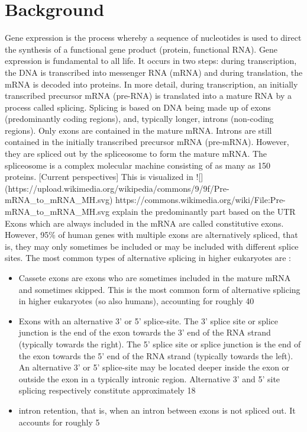 \chapter{\label{ch:2-litreview}Background}

\minitoc

Gene expression is the process whereby a sequence of nucleotides is used to direct the synthesis of a functional gene product (protein, functional RNA). Gene expression is fundamental to all life. It occurs in two steps: during transcription, the DNA is transcribed into messenger RNA (mRNA) and during translation, the mRNA is decoded into proteins.
In more detail, during transcription, an initially transcribed precursor mRNA (pre-RNA) is translated into a mature RNA by a process called splicing. Splicing is based on DNA being made up of exons (predominantly coding regions), and, typically longer, introns (non-coding regions).
Only exons are contained in the mature mRNA. Introns are still contained in the initially transcribed precursor mRNA (pre-mRNA). However, they are spliced out by the spliceosome to form the mature mRNA. The spliceosome is a complex molecular machine consisting of as many as 150 proteins. [Current perspectives] This is visualized in ![](https://upload.wikimedia.org/wikipedia/commons/9/9f/Pre-mRNA_to_mRNA_MH.svg)
https://commons.wikimedia.org/wiki/File:Pre-mRNA_to_mRNA_MH.svg
explain the predominantly part based on the UTR
Exons which are always included in the mRNA are called constitutive exons. However, 95\% of human genes with multiple exons are alternatively spliced, that is, they may only sometimes be included or may be included with different splice sites. The most common types of alternative splicing in higher eukaryotes are \cite{commonsplicing1}\cite{commonsplicing2}:

\begin{itemize}
\item Cassete exons are exons who are sometimes included in the mature mRNA and sometimes skipped. This is the most common form of alternative splicing in higher eukaryotes (so also humans), accounting for roughly 40%
\item Exons with an alternative 3' or 5' splice-site. The 3' splice site or splice junction is the end of the exon towards the 3' end of the RNA strand (typically towards the right). The 5' splice site or splice junction is the end of the exon towards the 5' end of the RNA strand (typically towards the left). An alternative 3' or 5' splice-site may be located deeper inside the exon or outside the exon in a typically intronic region. Alternative 3' and 5' site splicing respectively constitute approximately 18%
\item intron retention, that is, when an intron between exons is not spliced out. It accounts for roughly 5%
\end{itemize}

